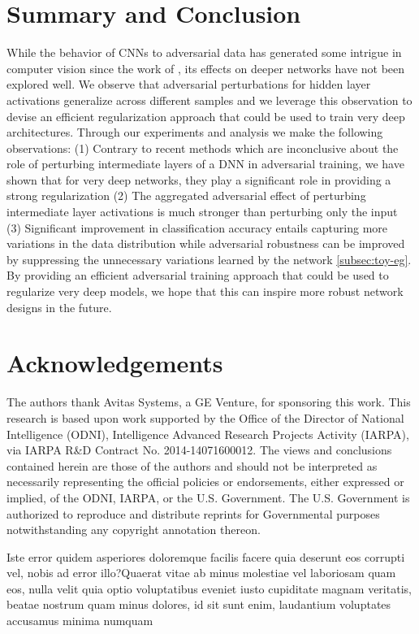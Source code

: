 \documentclass[letterpaper]{article} %
\begin{document}
\section{Summary and Conclusion}\label{sec:conclusion}
While the behavior of CNNs to adversarial data has generated some intrigue in computer vision since the work of \cite{szegedy2013intriguing}, its effects on deeper networks have not been explored well. We observe that adversarial perturbations for hidden layer activations generalize across different samples and we leverage this observation to devise an efficient regularization approach that could be used to train very deep architectures.  Through our experiments and analysis we make the following observations: (1) Contrary to recent methods which are inconclusive about the role of perturbing intermediate layers of a DNN in adversarial training, we have shown that for very deep networks, they play a significant role in providing a strong regularization (2) The aggregated adversarial effect of perturbing intermediate layer activations is much stronger than perturbing only the input (3) Significant improvement in classification accuracy entails capturing more variations in the data distribution while adversarial robustness can be improved by suppressing the unnecessary variations learned by the network \ref{subsec:toy-eg}. By providing an efficient adversarial training approach that could be used to regularize very deep models, we hope that this can inspire more robust network designs in the future.

\section{Acknowledgements}
The authors thank Avitas Systems, a GE Venture, for sponsoring this work. This research is based upon work supported by the Office of the Director of National Intelligence (ODNI), Intelligence
Advanced Research Projects Activity (IARPA), via IARPA R\&D Contract No. 2014-14071600012. The
views and conclusions contained herein are those of the authors and should not be interpreted as necessarily representing the official policies or endorsements, either expressed or implied, of the ODNI, IARPA, or the U.S. Government. The U.S. Government is authorized to reproduce and distribute reprints for Governmental purposes notwithstanding any copyright annotation thereon.



Iste error quidem asperiores doloremque facilis facere quia deserunt eos corrupti vel, nobis ad error illo?Quaerat vitae ab minus molestiae vel laboriosam quam eos, nulla velit quia optio voluptatibus eveniet iusto cupiditate magnam veritatis, beatae nostrum quam minus dolores, id sit sunt enim, laudantium voluptates accusamus minima numquam

\end{document}
